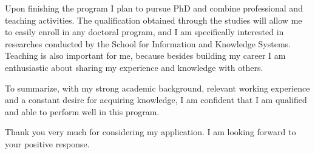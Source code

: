 \documentclass[a4paper,12pt]{article}
\begin{document}
Upon finishing the program I plan to pursue PhD and combine professional and teaching activities. The qualification obtained through the studies will allow me to easily enroll in any doctoral program, and I am specifically interested in researches conducted by the School for Information and Knowledge Systems. Teaching is also important for me, because besides building my career I am enthusiastic about sharing my experience and knowledge with others.

To summarize, with my strong academic background, relevant working experience and a constant desire for acquiring knowledge, I am confident that I am qualified and able to perform well in this program.

Thank you very much for considering my application. I am looking forward to your positive response.
\end{document}
